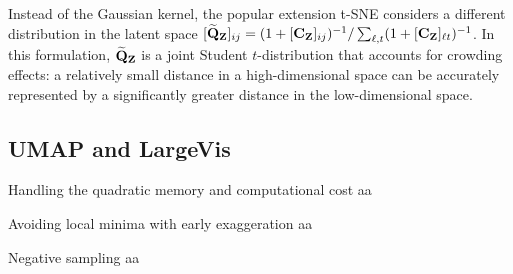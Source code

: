 

Instead of the Gaussian kernel, the popular extension t-SNE \citep{van2008visualizing} considers a different distribution in the latent space $[\widetilde{\mathbf{Q}}_{\mathbf{Z}}]_{ij} = (1 + [\mathbf{C}_{\mathbf{Z}}]_{ij})^{-1}/\sum_{\ell,t}(1 +
[\mathbf{C}_{\mathbf{Z}}]_{\ell t})^{-1}$. In this formulation, $\widetilde{\mathbf{Q}}_{\mathbf{Z}}$ is a joint
Student $t$-distribution that accounts for crowding effects: a relatively small
distance in a high-dimensional space can be accurately represented by a
significantly greater distance in the low-dimensional space.  

\subsection{UMAP and LargeVis}

\begin{rem2}{Handling the quadratic memory and computational cost}
    aa
\end{rem2}

\begin{rem2}{Avoiding local minima with early exaggeration}
    aa
\end{rem2}

\begin{rem2}{Negative sampling}
    aa
\end{rem2}